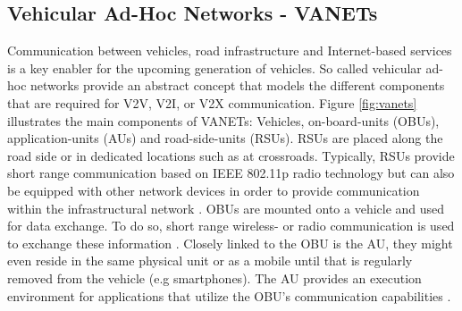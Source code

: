\documentclass{llncs}
\begin{document}
{		%
		
		\subsection{Vehicular Ad-Hoc Networks - VANETs}
			\label{ss:vanets}

			Communication between vehicles, road infrastructure and Internet-based services is a key enabler for the upcoming generation of vehicles. So called vehicular ad-hoc networks provide an abstract concept that models the different components that are required for V2V, V2I, or V2X communication. Figure \ref{fig:vanets} illustrates the main components of VANETs: Vehicles, on-board-units (OBUs), application-units (AUs) and road-side-units (RSUs).
			RSUs are placed  along the road side or in dedicated locations such as at crossroads. Typically, RSUs provide short range communication based on IEEE 802.11p radio technology but can also be equipped with other network devices in order to provide communication within the infrastructural network \cite{al2014comprehensive}. OBUs are mounted onto a vehicle and used for data exchange. To do so, short range wireless- or radio communication is used to exchange these information \cite{baldessari2007car}. Closely linked to the OBU is the AU, they might even reside in the same physical unit or as a mobile until that is regularly removed from the vehicle (e.g smartphones). The AU provides an execution environment for applications that utilize the OBU's communication capabilities \cite{al2014comprehensive}\cite{baldessari2007car}.
			
}
\end{document}
